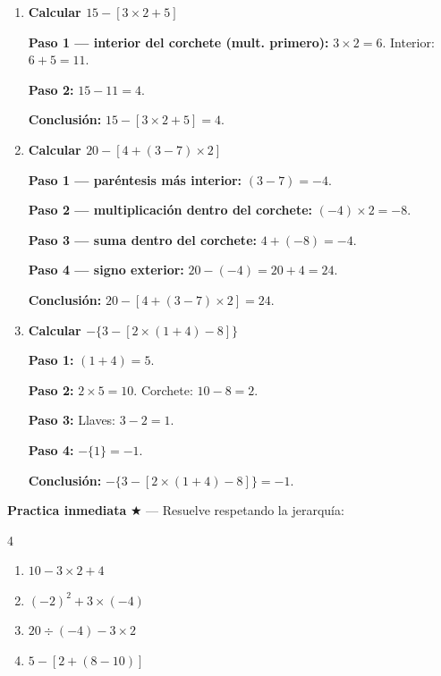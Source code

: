 \documentclass[11pt, letterpaper]{article}
\begin{document}
\begin{tcolorbox}[examplebox, title={Ejemplos --- par\'entesis anidados paso a paso}]
\begin{enumerate}[label=\textbf{Ej. \arabic*.}, leftmargin=*, itemsep=12pt]

\item \textbf{Calcular $15-[3\times 2+5]$}

\textbf{Paso 1 --- interior del corchete (mult. primero):} $3\times 2=6$. Interior: $6+5=11$.

\textbf{Paso 2:} $15-11=4$.

\textbf{Conclusi\'on:} $15-[3\times 2+5]=4$.

\item \textbf{Calcular $20-[4+(3-7)\times 2]$}

\textbf{Paso 1 --- par\'entesis m\'as interior:} $(3-7)=-4$.

\textbf{Paso 2 --- multiplicaci\'on dentro del corchete:} $(-4)\times 2=-8$.

\textbf{Paso 3 --- suma dentro del corchete:} $4+(-8)=-4$.

\textbf{Paso 4 --- signo exterior:} $20-(-4)=20+4=24$.

\textbf{Conclusi\'on:} $20-[4+(3-7)\times 2]=24$.

\item \textbf{Calcular $-\{3-[2\times(1+4)-8]\}$}

\textbf{Paso 1:} $(1+4)=5$.

\textbf{Paso 2:} $2\times 5=10$. Corchete: $10-8=2$.

\textbf{Paso 3:} Llaves: $3-2=1$.

\textbf{Paso 4:} $-\{1\}=-1$.

\textbf{Conclusi\'on:} $-\{3-[2\times(1+4)-8]\}=-1$.

\end{enumerate}
\end{tcolorbox}

\medskip
\textbf{Practica inmediata} \quad $\bigstar$ --- Resuelve respetando la jerarqu\'ia:
\begin{multicols}{4}
\begin{enumerate}[label=\alph*), leftmargin=*]
  \item $10-3\times 2+4$
  \item $(-2)^2+3\times(-4)$
  \item $20\div(-4)-3\times 2$
  \item $5-[2+(8-10)]$
\end{enumerate}
\end{multicols}
\end{document}
